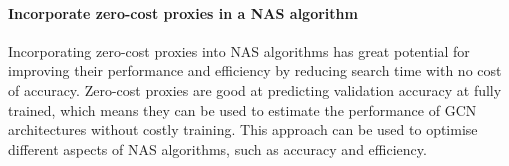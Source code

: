 \paragraph{Incorporate zero-cost proxies in a NAS algorithm}
Incorporating zero-cost proxies into \gls{NAS} algorithms has great potential for improving their performance and efficiency by reducing search time with no cost of accuracy. Zero-cost proxies are good at predicting validation accuracy at fully trained, which means they can be used to estimate the performance of \gls{GCN} architectures without costly training. This approach can be used to optimise different aspects of \gls{NAS} algorithms, such as accuracy and efficiency.

\begin{comment}
    
Overall findings suggest that incorporating zero-cost proxies into \gls{NAS} algorithms has excellent potential for improving their performance and efficiency in various applications while reducing search time with no cost of accuracy.
\end{comment}